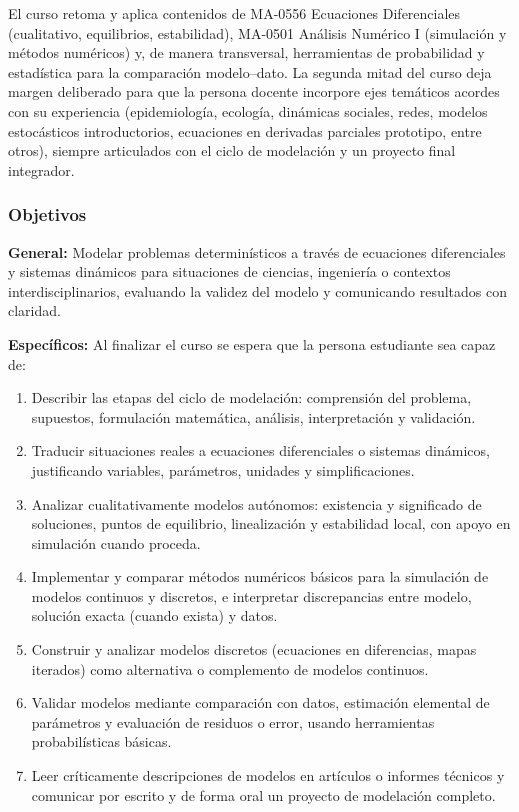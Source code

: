 \begin{refsection}
El curso retoma y aplica contenidos de MA-0556 Ecuaciones Diferenciales (cualitativo, equilibrios, estabilidad), MA-0501 Análisis Numérico I (simulación y métodos numéricos) y, de manera transversal, herramientas de probabilidad y estadística para la comparación modelo--dato. La segunda mitad del curso deja margen deliberado para que la persona docente incorpore ejes temáticos acordes con su experiencia (epidemiología, ecología, dinámicas sociales, redes, modelos estocásticos introductorios, ecuaciones en derivadas parciales prototipo, entre otros), siempre articulados con el ciclo de modelación y un proyecto final integrador.

\subsubsection*{Objetivos}

\textbf{General:} Modelar problemas determinísticos a través de ecuaciones diferenciales y sistemas dinámicos para situaciones de ciencias, ingeniería o contextos interdisciplinarios, evaluando la validez del modelo y comunicando resultados con claridad.

\textbf{Específicos:} Al finalizar el curso se espera que la persona estudiante sea capaz de:

\begin{enumerate}
\item Describir las etapas del ciclo de modelación: comprensión del problema, supuestos, formulación matemática, análisis, interpretación y validación.
\item Traducir situaciones reales a ecuaciones diferenciales o sistemas dinámicos, justificando variables, parámetros, unidades y simplificaciones.
\item Analizar cualitativamente modelos autónomos: existencia y significado de soluciones, puntos de equilibrio, linealización y estabilidad local, con apoyo en simulación cuando proceda.
\item Implementar y comparar métodos numéricos básicos para la simulación de modelos continuos y discretos, e interpretar discrepancias entre modelo, solución exacta (cuando exista) y datos.
\item Construir y analizar modelos discretos (ecuaciones en diferencias, mapas iterados) como alternativa o complemento de modelos continuos.
\item Validar modelos mediante comparación con datos, estimación elemental de parámetros y evaluación de residuos o error, usando herramientas probabilísticas básicas.
\item Leer críticamente descripciones de modelos en artículos o informes técnicos y comunicar por escrito y de forma oral un proyecto de modelación completo.
\end{enumerate}


\end{refsection}
